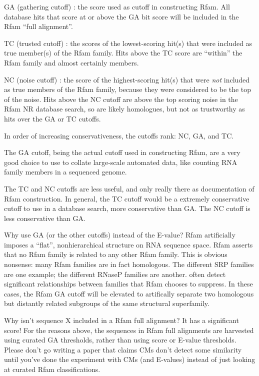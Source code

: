 \begin{wideitem}
\item[GA (gathering cutoff)]: the score used as cutoff in
constructing Rfam. All database hits that score at or above the 
GA bit score will be included in the Rfam ``full alignment''.

\item[TC (trusted cutoff)]: the scores of the lowest-scoring hit(s)
that were included as true member(s) of the Rfam family. Hits above
the TC score are ``within'' the Rfam family and almost certainly
members.

\item[NC (noise cutoff)]: the score of the highest-scoring hit(s) that
were \textit{not} included as true members of the Rfam family, because
they were considered to be the top of the noise.  Hits above the NC
cutoff are above the top scoring noise in the Rfam NR database search,
so are likely homologues, but not as trustworthy as hits over the GA
or TC cutoffs.
\end{wideitem}

In order of increasing conservativeness, the cutoffs rank: NC, GA, and
TC.

The GA cutoff, being the actual cutoff used in constructing Rfam,
are a very good choice to use to collate large-scale automated data,
like counting RNA family members in a sequenced genome.

The TC and NC cutoffs are less useful, and only really there as
documentation of Rfam construction. In general, the TC cutoff would
be a extremely conservative cutoff to use in a database search, more
conservative than GA. The NC cutoff is less conservative than GA.

Why use GA (or the other cutoffs) instead of the E-value? Rfam
artificially imposes a ``flat'', nonhierarchical structure on RNA
sequence space.  Rfam asserts that no Rfam family is related to any
other Rfam family. This is obvious nonsense: many Rfam families are in
fact homologous.  The different SRP families are one example; the
different RNaseP families are another.  often
detect significant relationships between families that Rfam chooses to
suppress. In these cases, the Rfam GA cutoff will be elevated to
artifically separate two homologous but distantly related subgroups of
the same structural superfamily.

\begin{srefaq}{Why isn't sequence X included in a Rfam full alignment?
It has a significant score!} For the reasons above, the sequences in
Rfam full alignments are harvested using curated GA thresholds, rather
than using score or E-value thresholds. Please don't go writing a
paper that claims CMs don't detect some similarity until you've done
the experiment with CMs (and E-values) instead of just looking at
curated Rfam classifications.
\end{srefaq}

